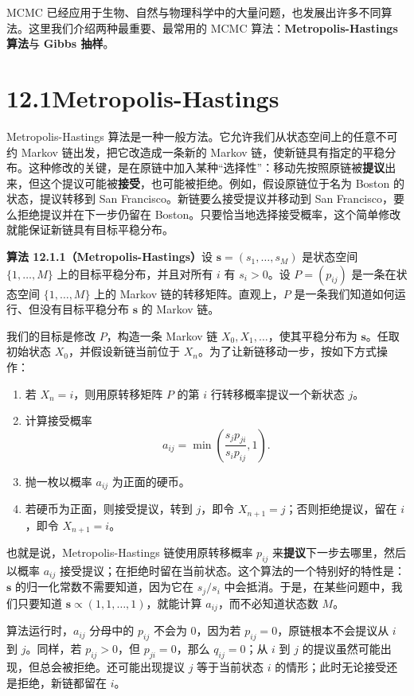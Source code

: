 \documentclass[UTF8, 12pt, fontset=fandol, oneside]{ctexart}
\begin{document}
MCMC 已经应用于生物、自然与物理科学中的大量问题，也发展出许多不同算法。这里我们介绍两种最重要、最常用的 MCMC 算法：\textbf{Metropolis-Hastings 算法}与 \textbf{Gibbs 抽样}。

\section*{12.1\quad Metropolis-Hastings}

Metropolis-Hastings 算法是一种一般方法。它允许我们从状态空间上的任意不可约 Markov 链出发，把它改造成一条新的 Markov 链，使新链具有指定的平稳分布。这种修改的关键，是在原链中加入某种“选择性”：移动先按照原链被\textbf{提议}出来，但这个提议可能被\textbf{接受}，也可能被拒绝。例如，假设原链位于名为 Boston 的状态，提议转移到 San Francisco。新链要么接受提议并移动到 San Francisco，要么拒绝提议并在下一步仍留在 Boston。只要恰当地选择接受概率，这个简单修改就能保证新链具有目标平稳分布。

\noindent\textbf{算法 12.1.1（Metropolis-Hastings）}\quad 设 $\mathbf s=(s_1,\ldots,s_M)$ 是状态空间 $\{1,\ldots,M\}$ 上的目标平稳分布，并且对所有 $i$ 有 $s_i>0$。设 $P=(p_{ij})$ 是一条在状态空间 $\{1,\ldots,M\}$ 上的 Markov 链的转移矩阵。直观上，$P$ 是一条我们知道如何运行、但没有目标平稳分布 $\mathbf s$ 的 Markov 链。

我们的目标是修改 $P$，构造一条 Markov 链 $X_0,X_1,\ldots$，使其平稳分布为 $\mathbf s$。任取初始状态 $X_0$，并假设新链当前位于 $X_n$。为了让新链移动一步，按如下方式操作：
\begin{enumerate}
  \item 若 $X_n=i$，则用原转移矩阵 $P$ 的第 $i$ 行转移概率提议一个新状态 $j$。
  \item 计算接受概率
  \[
    a_{ij}=\min\left(\frac{s_jp_{ji}}{s_ip_{ij}},1\right).
  \]
  \item 抛一枚以概率 $a_{ij}$ 为正面的硬币。
  \item 若硬币为正面，则接受提议，转到 $j$，即令 $X_{n+1}=j$；否则拒绝提议，留在 $i$，即令 $X_{n+1}=i$。
\end{enumerate}

也就是说，Metropolis-Hastings 链使用原转移概率 $p_{ij}$ 来\textbf{提议}下一步去哪里，然后以概率 $a_{ij}$ 接受提议；在拒绝时留在当前状态。这个算法的一个特别好的特性是：$\mathbf s$ 的归一化常数不需要知道，因为它在 $s_j/s_i$ 中会抵消。于是，在某些问题中，我们只要知道 $\mathbf s\propto(1,1,\ldots,1)$，就能计算 $a_{ij}$，而不必知道状态数 $M$。

算法运行时，$a_{ij}$ 分母中的 $p_{ij}$ 不会为 $0$，因为若 $p_{ij}=0$，原链根本不会提议从 $i$ 到 $j$。同样，若 $p_{ij}>0$，但 $p_{ji}=0$，那么 $q_{ij}=0$；从 $i$ 到 $j$ 的提议虽然可能出现，但总会被拒绝。还可能出现提议 $j$ 等于当前状态 $i$ 的情形；此时无论接受还是拒绝，新链都留在 $i$。
\end{document}
